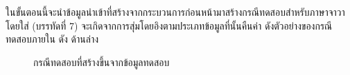 \subsubsection{\testcaseGeneration}
\label{sec:sub:sub:tcGen}

ในขั้นตอนนี้จะนำข้อมูลนำเข้าที่สร้างจากกระบวนการก่อนหน้ามาสร้างกรณีทดสอบสำหรับภาษาจาวา โดยใส่{\expectedOutput} (บรรทัดที่ 7) 
จะเกิดจากการสุ่มโดยอิงตามประเภทข้อมูลที่{\method}นั้นคืนค่า ดังตัวอย่างของกรณีทดสอบภายใน {\it \testSuite} ดัง  ด้านล่าง

\begin{figure}[ht!]
    \lstset{basicstyle=\small,style=thesiscodestyle}
    
    \caption{กรณีทดสอบที่สร้างขึ้นจากข้อมูลทดสอบ}
    \label{fig:junitGradingTest}
\end{figure}

\subsection{\expectedOutputAdjustment}
\label{sec:sub:expectedOutputAdj}


